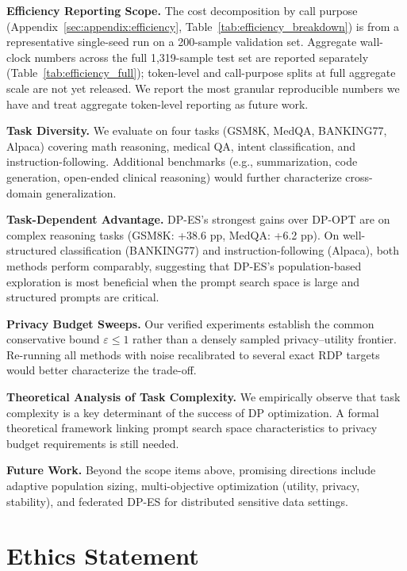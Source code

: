 \documentclass[11pt]{article}
\begin{document}
\noindent \textbf{Efficiency Reporting Scope.}
The cost decomposition by call purpose (Appendix~\ref{sec:appendix:efficiency}, Table~\ref{tab:efficiency_breakdown}) is from a representative single-seed run on a 200-sample validation set. Aggregate wall-clock numbers across the full 1{,}319-sample test set are reported separately (Table~\ref{tab:efficiency_full}); token-level and call-purpose splits at full aggregate scale are not yet released. We report the most granular reproducible numbers we have and treat aggregate token-level reporting as future work.

\noindent \textbf{Task Diversity.}
We evaluate on four tasks (GSM8K, MedQA, BANKING77, Alpaca) covering math reasoning, medical QA, intent classification, and instruction-following. Additional benchmarks (e.g., summarization, code generation, open-ended clinical reasoning) would further characterize cross-domain generalization.

\noindent \textbf{Task-Dependent Advantage.}
DP-ES's strongest gains over DP-OPT are on complex reasoning tasks (GSM8K: +38.6 pp, MedQA: +6.2 pp). On well-structured classification (BANKING77) and instruction-following (Alpaca), both methods perform comparably, suggesting that DP-ES's population-based exploration is most beneficial when the prompt search space is large and structured prompts are critical.

\noindent \textbf{Privacy Budget Sweeps.}
Our verified experiments establish the common conservative bound $\varepsilon\leq1$ rather than a densely sampled privacy--utility frontier. Re-running all methods with noise recalibrated to several exact RDP targets would better characterize the trade-off.

\noindent \textbf{Theoretical Analysis of Task Complexity.}
We empirically observe that task complexity is a key determinant of the success of DP optimization. A formal theoretical framework linking prompt search space characteristics to privacy budget requirements is still needed.

\noindent \textbf{Future Work.}
Beyond the scope items above, promising directions include adaptive population sizing, multi-objective optimization (utility, privacy, stability), and federated DP-ES for distributed sensitive data settings.

\section*{Ethics Statement}
\end{document}
